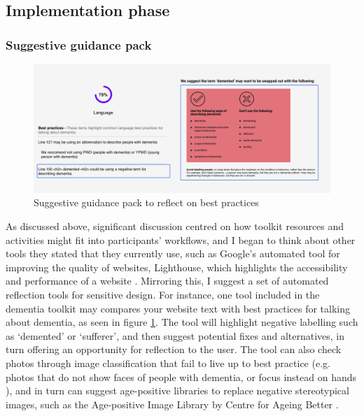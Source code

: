 \subsection{Implementation phase}
\subsubsection{Suggestive guidance pack}
\begin{figure}[h]
\centering
\includegraphics[width=1\linewidth]{Images/D3Toolkit/Fig10.png}
\caption{Suggestive guidance pack to reflect on best practices}
\label{fig:suggestPack}
\end{figure}
As discussed above, significant discussion centred on how toolkit resources and activities might fit into participants’ workflows, and I began to think about other tools they stated that they currently use, such as Google’s automated tool for improving the quality of websites, Lighthouse, which highlights the accessibility and performance of a website \citep{chrome_lighthouse_2021}. Mirroring this, I suggest a set of automated reflection tools for sensitive design. For instance, one tool included in the dementia toolkit may compares your website text with best practices for talking about dementia, as seen in figure \ref{fig:suggestPack}. The tool will highlight negative labelling such as `demented' or `sufferer', and then suggest potential fixes and alternatives, in turn offering an opportunity for reflection to the user. The tool can also check photos through image classification that fail to live up to best practice (e.g. photos that do not show faces of people with dementia, or focus instead on hands \citep{low2020negative}), and in turn can suggest age-positive libraries to replace negative stereotypical images, such as the Age-positive Image Library by Centre for Ageing Better \citep{noauthor_age-positive_nodate}. 

